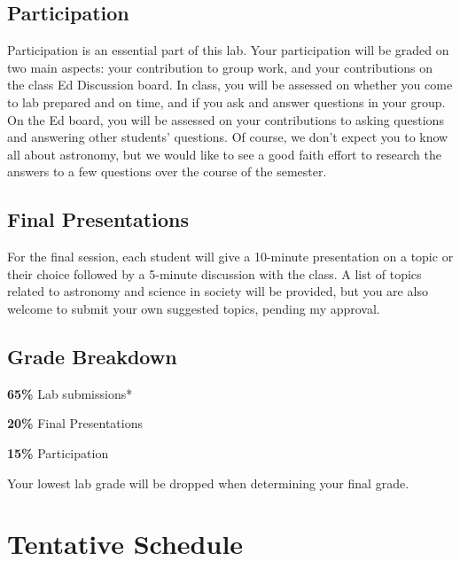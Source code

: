 \documentclass[11pt]{article}
\begin{document}
\subsection*{Participation}
\noindent Participation is an essential part of this lab. Your participation will be graded on two main aspects: your contribution to group work, and your contributions on the class Ed Discussion board.  In class, you will be assessed on whether you come to lab prepared and on time, and if you ask and answer questions in your group.  On the Ed board, you will be assessed on your contributions to asking questions and answering other students' questions.  Of course, we don't expect you to know all about astronomy, but we would like to see a good faith effort to research the answers to a few questions over the course of the semester.

\smallskip

\subsection*{Final Presentations}
\noindent For the final session, each student will give a 10-minute presentation on a topic or their choice followed by a 5-minute discussion with the class. A list of topics related to astronomy and science in society will be provided, but you are also welcome to submit your own suggested topics, pending my approval.

\subsection*{Grade Breakdown}
\noindent \textbf{65\%} Lab submissions*

\noindent \textbf{20\%} Final Presentations

\noindent \textbf{15\%} Participation

\noindent *Your lowest lab grade will be dropped when determining your final grade.

\section*{Tentative Schedule}
\end{document}
